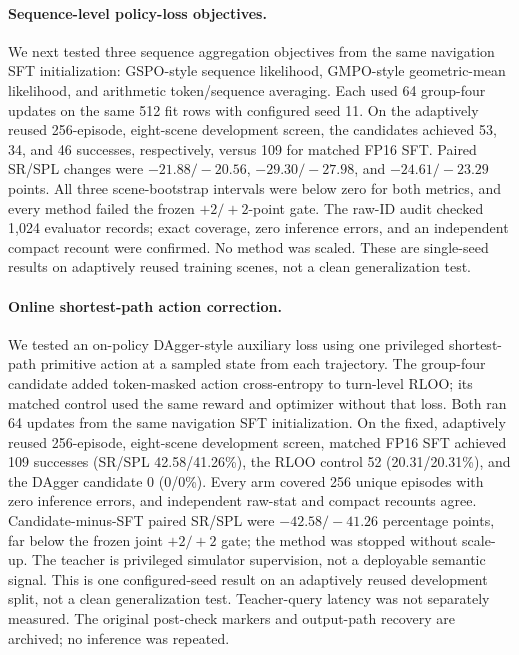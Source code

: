 \documentclass[10pt,twocolumn,letterpaper]{article}
\begin{document}
\paragraph{Sequence-level policy-loss objectives.} We next tested three
sequence aggregation objectives from the same navigation SFT initialization:
GSPO-style sequence likelihood, GMPO-style geometric-mean likelihood, and
arithmetic token/sequence averaging. Each used 64 group-four updates on the
same 512 fit rows with configured seed 11. On the adaptively reused
256-episode, eight-scene development screen, the candidates achieved 53, 34,
and 46 successes, respectively, versus 109 for matched FP16 SFT. Paired
SR/SPL changes were $-21.88/-20.56$, $-29.30/-27.98$, and $-24.61/-23.29$
points. All three scene-bootstrap intervals were below zero for both metrics,
and every method failed the frozen $+2/+2$-point gate. The raw-ID audit
checked 1,024 evaluator records; exact coverage, zero inference errors, and
an independent compact recount were confirmed. No method was scaled. These
are single-seed results on adaptively reused training scenes, not a clean
generalization test.

\paragraph{Online shortest-path action correction.} We tested an on-policy
DAgger-style auxiliary loss using one privileged shortest-path primitive
action at a sampled state from each trajectory. The group-four candidate
added token-masked action cross-entropy to turn-level RLOO; its matched
control used the same reward and optimizer without that loss. Both ran 64
updates from the same navigation SFT initialization. On the fixed, adaptively
reused 256-episode, eight-scene development screen, matched FP16 SFT achieved
109 successes (SR/SPL 42.58/41.26\%), the RLOO control 52
(20.31/20.31\%), and the DAgger candidate 0 (0/0\%). Every arm covered 256
unique episodes with zero inference errors, and independent raw-stat and
compact recounts agree. Candidate-minus-SFT paired SR/SPL were
$-42.58/-41.26$ percentage points, far below the frozen joint $+2/+2$
gate; the method was stopped without scale-up. The teacher is privileged
simulator supervision, not a deployable semantic signal. This is one
configured-seed result on an adaptively reused development split, not a clean
generalization test. Teacher-query latency was not separately measured.
The original post-check markers and output-path recovery are archived; no
inference was repeated.
\end{document}

